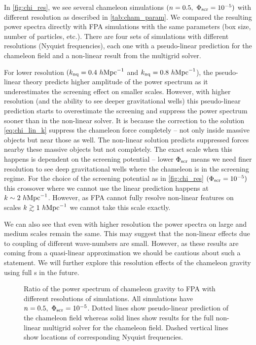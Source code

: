 In \autoref{fig:chi_res}, we see several chameleon simulations $(n=0.5,\ \Phi_{\text{\scriptsize scr}}=10^{-5})$ with different resolution as described in \autoref{tab:cham_param}. We compared the resulting power spectra directly with FPA simulations with the same parameters (box size, number of particles, etc.). There are four sets of simulations with different resolutions (Nyquist frequencies), each one with a pseudo-linear prediction for the chameleon field and a non-linear result from the multigrid solver.

For lower resolution $(k_{\rm nq} = 0.4~h\text{Mpc}^{-1}$ and $k_{\rm nq} = 0.8~h\text{Mpc}^{-1}$), the pseudo-linear theory predicts higher amplitude of the power spectrum as it underestimates the screening effect on smaller scales. However, with higher resolution (and the ability to see deeper gravitational wells) this pseudo-linear prediction starts to overestimate the screening and suppress the power spectrum sooner than in the non-linear solver. It is because the correction to the solution \eqref{eq:chi_lin_k} suppress the chameleon force completely -- not only inside massive objects but near those as well. The non-linear solution predicts suppressed forces nearby these massive objects but not completely. The exact scale when this happens is dependent on the screening potential -- lower $\Phi_{\text{\scriptsize scr}}$ means we need finer resolution to see deep gravitational wells where the chameleon is in the screening regime. For the choice of the screening potential as in \autoref{fig:chi_res} $(\Phi_{\text{\scriptsize scr}}=10^{-5})$ this crossover where we cannot use the linear prediction happens at $k\sim2~h\text{Mpc}^{-1}$. However, as FPA cannot fully resolve non-linear features on scales $k\gtrsim1~h\text{Mpc}^{-1}$  we cannot take this scale exactly.

We can also see that even with higher resolution the power spectra on large and medium scales remain the same. This may suggest that the non-linear effects due to coupling of different wave-numbers are small. However, as these results are coming from a quasi-linear approximation we should be cautious about such a statement. We will further explore this resolution effects of the chameleon gravity using full \nbody s in the future.

\begin{figure}
  \centering
	\begin{subfigure}{0.5\textwidth}
	\end{subfigure}
	\begin{subfigure}{0.5\textwidth}
	\end{subfigure}
  \caption{Ratio of the power spectrum of chameleon gravity to FPA with different resolutions of simulations. All simulations have $n=0.5,\ \Phi_{\text{\scriptsize scr}}=10^{-5}$. Dotted lines show pseudo-linear prediction of the chameleon field whereas solid lines show results for the full non-linear multigrid solver for the chameleon field. Dashed vertical lines show locations of corresponding Nyquist frequencies.}
  \label{fig:chi_res}
\end{figure}

